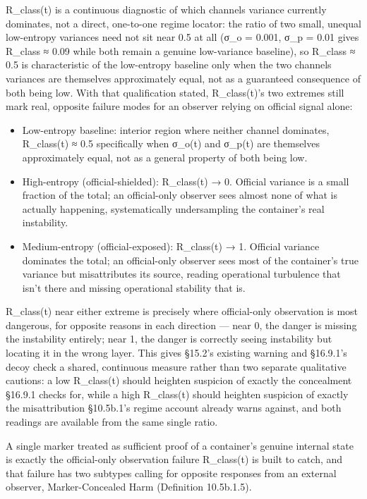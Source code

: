 \documentclass[
]{article}
\begin{document}
R\_class(t) is a continuous diagnostic of which channels variance
currently dominates, not a direct, one-to-one regime locator: the ratio
of two small, unequal low-entropy variances need not sit near 0.5 at all
(σ\_o = 0.001, σ\_p = 0.01 gives R\_class ≈ 0.09 while both remain a
genuine low-variance baseline), so R\_class ≈ 0.5 is characteristic of
the low-entropy baseline only when the two channels variances are
themselves approximately equal, not as a guaranteed consequence of both
being low. With that qualification stated, R\_class(t)'s two extremes
still mark real, opposite failure modes for an observer relying on
official signal alone:

\begin{itemize}
\item
  Low-entropy baseline: interior region where neither channel dominates,
  R\_class(t) ≈ 0.5 specifically when σ\_o(t) and σ\_p(t) are themselves
  approximately equal, not as a general property of both being low.
\item
  High-entropy (official-shielded): R\_class(t) → 0. Official variance
  is a small fraction of the total; an official-only observer sees
  almost none of what is actually happening, systematically
  undersampling the container's real instability.
\item
  Medium-entropy (official-exposed): R\_class(t) → 1. Official variance
  dominates the total; an official-only observer sees most of the
  container's true variance but misattributes its source, reading
  operational turbulence that isn't there and missing operational
  stability that is.
\end{itemize}

R\_class(t) near either extreme is precisely where official-only
observation is most dangerous, for opposite reasons in each direction
--- near 0, the danger is missing the instability entirely; near 1, the
danger is correctly seeing instability but locating it in the wrong
layer. This gives §15.2's existing warning and §16.9.1's decoy check a
shared, continuous measure rather than two separate qualitative
cautions: a low R\_class(t) should heighten suspicion of exactly the
concealment §16.9.1 checks for, while a high R\_class(t) should heighten
suspicion of exactly the misattribution §10.5b.1's regime account
already warns against, and both readings are available from the same
single ratio.

A single marker treated as sufficient proof of a container's genuine
internal state is exactly the official-only observation failure
R\_class(t) is built to catch, and that failure has two subtypes calling
for opposite responses from an external observer, Marker-Concealed Harm
(Definition 10.5b.1.5).
\end{document}
